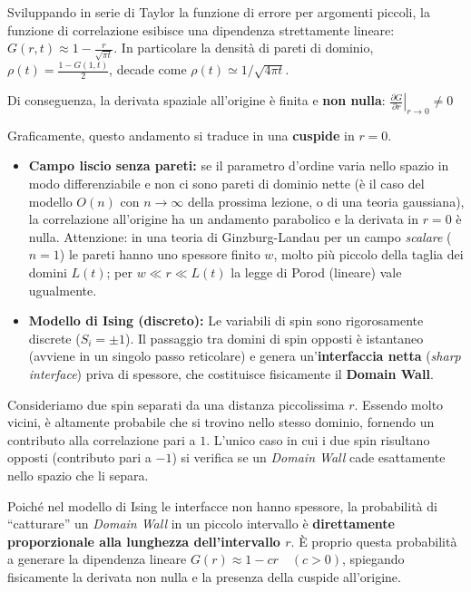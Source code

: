 \begin{enumerate}
   Sviluppando in serie di Taylor la funzione di errore per argomenti piccoli, la funzione di correlazione esibisce una dipendenza strettamente lineare: $G(r, t) \approx 1 - \frac{r}{\sqrt{\pi t}}$. In particolare la densità di pareti di dominio, $\rho(t) = \frac{1 - G(1,t)}{2}$, decade come $\rho(t) \simeq 1/\sqrt{4\pi t}$.

Di conseguenza, la derivata spaziale all'origine è finita e \textbf{non nulla}: $\left. \frac{\partial G}{\partial r} \right|_{r \to 0} \neq 0$

Graficamente, questo andamento si traduce in una \textbf{cuspide} in $r=0$.

\begin{itemize}
    \item \textbf{Campo liscio senza pareti:} se il parametro d'ordine varia nello spazio in modo differenziabile e non ci sono pareti di dominio nette (è il caso del modello $O(n)$ con $n \to \infty$ della prossima lezione, o di una teoria gaussiana), la correlazione all'origine ha un andamento parabolico e la derivata in $r=0$ è nulla. Attenzione: in una teoria di Ginzburg-Landau per un campo \textit{scalare} ($n=1$) le pareti hanno uno spessore finito $w$, molto più piccolo della taglia dei domini $L(t)$; per $w \ll r \ll L(t)$ la legge di Porod (lineare) vale ugualmente.
    
    \item \textbf{Modello di Ising (discreto):} Le variabili di spin sono rigorosamente discrete ($S_i = \pm 1$). Il passaggio tra domini di spin opposti è istantaneo (avviene in un singolo passo reticolare) e genera un'\textbf{interfaccia netta} (\textit{sharp interface}) priva di spessore, che costituisce fisicamente il \textbf{Domain Wall}.
\end{itemize}

Consideriamo due spin separati da una distanza piccolissima $r$. Essendo molto vicini, è altamente probabile che si trovino nello stesso dominio, fornendo un contributo alla correlazione pari a $1$. L'unico caso in cui i due spin risultano opposti (contributo pari a $-1$) si verifica se un \textit{Domain Wall} cade esattamente nello spazio che li separa.

Poiché nel modello di Ising le interfacce non hanno spessore, la probabilità di ``catturare'' un \textit{Domain Wall} in un piccolo intervallo è \textbf{direttamente proporzionale alla lunghezza dell'intervallo $r$}. È proprio questa probabilità a generare la dipendenza lineare $G(r) \approx 1 - c r \quad (c > 0)$, spiegando fisicamente la derivata non nulla e la presenza della cuspide all'origine.
\end{enumerate}


